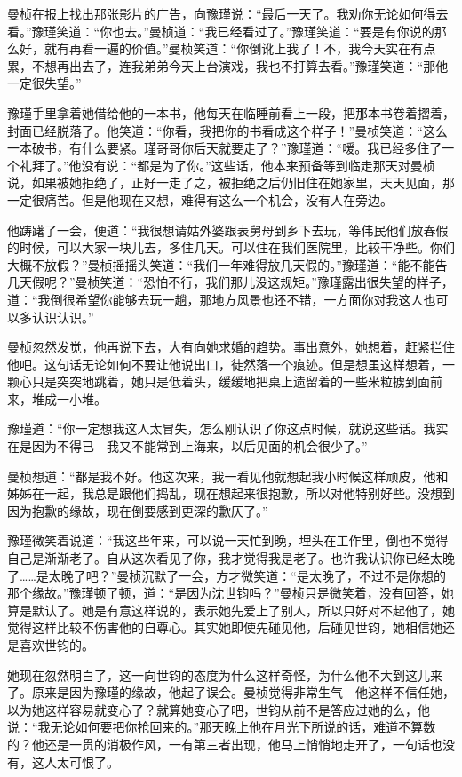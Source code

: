 \par 曼桢在报上找出那张影片的广告，向豫瑾说：“最后一天了。我劝你无论如何得去看。”豫瑾笑道：“你也去。”曼桢道：“我已经看过了。”豫瑾笑道：“要是有你说的那么好，就有再看一遍的价值。”曼桢笑道：“你倒讹上我了！不，我今天实在有点累，不想再出去了，连我弟弟今天上台演戏，我也不打算去看。”豫瑾笑道：“那他一定很失望。”
\par 豫瑾手里拿着她借给他的一本书，他每天在临睡前看上一段，把那本书卷着摺着，封面已经脱落了。他笑道：“你看，我把你的书看成这个样子！”曼桢笑道：“这么一本破书，有什么要紧。瑾哥哥你后天就要走了？”豫瑾道：“嗳。我已经多住了一个礼拜了。”他没有说：“都是为了你。”这些话，他本来预备等到临走那天对曼桢说，如果被她拒绝了，正好一走了之，被拒绝之后仍旧住在她家里，天天见面，那一定很痛苦。但是他现在又想，难得有这么一个机会，没有人在旁边。
\par 他踌躇了一会，便道：“我很想请姑外婆跟表舅母到乡下去玩，等伟民他们放春假的时候，可以大家一块儿去，多住几天。可以住在我们医院里，比较干净些。你们大概不放假？”曼桢摇摇头笑道：“我们一年难得放几天假的。”豫瑾道：“能不能告几天假呢？”曼桢笑道：“恐怕不行，我们那儿没这规矩。”豫瑾露出很失望的样子，道：“我倒很希望你能够去玩一趟，那地方风景也还不错，一方面你对我这人也可以多认识认识。”
\par 曼桢忽然发觉，他再说下去，大有向她求婚的趋势。事出意外，她想着，赶紧拦住他吧。这句话无论如何不要让他说出口，徒然落一个痕迹。但是想虽这样想着，一颗心只是突突地跳着，她只是低着头，缓缓地把桌上遗留着的一些米粒掳到面前来，堆成一小堆。
\par 豫瑾道：“你一定想我这人太冒失，怎么刚认识了你这点时候，就说这些话。我实在是因为不得已—我又不能常到上海来，以后见面的机会很少了。”
\par 曼桢想道：“都是我不好。他这次来，我一看见他就想起我小时候这样顽皮，他和姊姊在一起，我总是跟他们捣乱，现在想起来很抱歉，所以对他特别好些。没想到因为抱歉的缘故，现在倒要感到更深的歉仄了。”
\par 豫瑾微笑着说道：“我这些年来，可以说一天忙到晚，埋头在工作里，倒也不觉得自己是渐渐老了。自从这次看见了你，我才觉得我是老了。也许我认识你已经太晚了……是太晚了吧？”曼桢沉默了一会，方才微笑道：“是太晚了，不过不是你想的那个缘故。”豫瑾顿了顿，道：“是因为沈世钧吗？”曼桢只是微笑着，没有回答，她算是默认了。她是有意这样说的，表示她先爱上了别人，所以只好对不起他了，她觉得这样比较不伤害他的自尊心。其实她即使先碰见他，后碰见世钧，她相信她还是喜欢世钧的。
\par 她现在忽然明白了，这一向世钧的态度为什么这样奇怪，为什么他不大到这儿来了。原来是因为豫瑾的缘故，他起了误会。曼桢觉得非常生气—他这样不信任她，以为她这样容易就变心了？就算她变心了吧，世钧从前不是答应过她的么，他说：“我无论如何要把你抢回来的。”那天晚上他在月光下所说的话，难道不算数的？他还是一贯的消极作风，一有第三者出现，他马上悄悄地走开了，一句话也没有，这人太可恨了。
